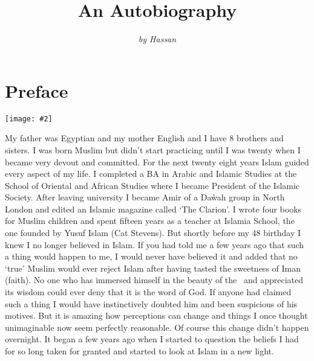 \documentclass[12pt]{memoir}
\title{An Autobiography}
\author{\emph{by Hassan}}
\date{}
\newcommand{\img}[3]{\begin{center}%
\texttt{[image: \#2]}\\{\small\em#3}%
\end{center}}
\begin{document}
\frontmatter

\maketitle
\thispagestyle{empty}
\cleardoublepage

\setcounter{page}{1}
\tableofcontents

\chapter{Preface}

\img{scale=0.1}{Tunis_Hassan.jpg}{}

My father was Egyptian and my mother English and I have 8 brothers and sisters.
I was born Muslim but didn’t start practicing until I was twenty
when I became very devout and committed.
For the next twenty eight years Islam guided every aspect of my life.
I completed a BA in Arabic and Islamic Studies at the School of Oriental
and African Studies where I became President of the Islamic Society.
After leaving university I became Amir of a Da\`wah group
in North London and edited an Islamic magazine called ‘The Clarion’.
I wrote four books for Muslim children and spent fifteen years as a teacher
at Islamia School, the one founded by Yusuf Islam (Cat Stevens).
But shortly before my 48 birthday I knew I no longer believed in Islam.
If you had told me a few years ago that such a thing would happen to me,
I would never have believed it and added that no ‘true’ Muslim
would ever reject Islam after having tasted the sweetness of Iman (faith).
No one who has immersed himself in the beauty of the \Quran\
and appreciated its wisdom could ever deny that it is the word of God.
If anyone had claimed such a thing I would have instinctively
doubted him and been suspicious of his motives.
But it is amazing how perceptions can change
and things I once thought unimaginable now seem perfectly reasonable.
Of course this change didn’t happen overnight.
It began a few years ago when I started to question the beliefs
I had for so long taken for granted
and started to look at Islam in a new light.
\end{document}
